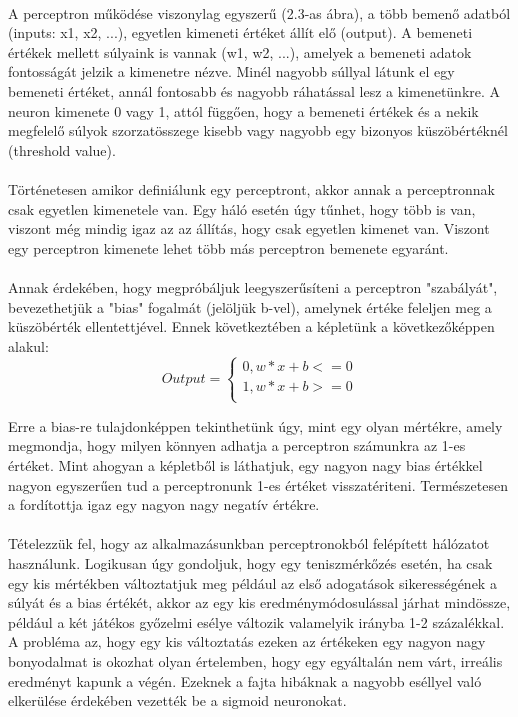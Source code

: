 \paragraph{}
A perceptron működése viszonylag egyszerű (2.3-as ábra), a több bemenő adatból (inputs: x1, x2, ...), egyetlen kimeneti értéket állít elő (output). A bemeneti értékek mellett súlyaink is vannak (w1, w2, ...), amelyek a bemeneti adatok fontosságát jelzik a kimenetre nézve. Minél nagyobb súllyal látunk el egy bemeneti értéket, annál fontosabb és nagyobb ráhatással lesz a kimenetünkre. A neuron kimenete 0 vagy 1, attól függően, hogy a bemeneti értékek és a nekik megfelelő súlyok szorzatösszege kisebb vagy nagyobb egy bizonyos küszöbértéknél (threshold value).

\paragraph{}
Történetesen amikor definiálunk egy perceptront, akkor annak a perceptronnak csak egyetlen kimenetele van. Egy háló esetén úgy tűnhet, hogy több is van, viszont még mindig igaz az az állítás, hogy csak egyetlen kimenet van. Viszont egy perceptron kimenete lehet több más perceptron bemenete egyaránt.

\paragraph{}
Annak érdekében, hogy megpróbáljuk leegyszerűsíteni a perceptron "szabályát", bevezethetjük a "bias" fogalmát (jelöljük b-vel), amelynek értéke feleljen meg a küszöbérték ellentettjével. Ennek következtében a képletünk a következőképpen alakul:
\[ 
Output= \left\{
\begin{array}{ll}
      0, w*x + b <= 0 \\
      1, w*x + b >= 0 \\
\end{array} 
\right. 
\]

Erre a bias-re tulajdonképpen tekinthetünk úgy, mint egy olyan mértékre, amely megmondja, hogy milyen könnyen adhatja a perceptron számunkra az 1-es értéket. Mint ahogyan a képletből is láthatjuk, egy nagyon nagy bias értékkel nagyon egyszerűen tud a perceptronunk 1-es értéket visszatériteni. Természetesen a fordítottja igaz egy nagyon nagy negatív értékre.

\paragraph{}
Tételezzük fel, hogy az alkalmazásunkban perceptronokból felépített hálózatot használunk. Logikusan úgy gondoljuk, hogy egy teniszmérkőzés esetén, ha csak egy kis mértékben változtatjuk meg például az első adogatások sikerességének a súlyát és a bias értékét, akkor az egy kis eredménymódosulással járhat mindössze, például a két játékos győzelmi esélye változik valamelyik irányba 1-2 százalékkal. A probléma az, hogy egy kis változtatás ezeken az értékeken egy nagyon nagy bonyodalmat is okozhat olyan értelemben, hogy egy egyáltalán nem várt, irreális eredményt kapunk a végén. Ezeknek a fajta hibáknak a nagyobb eséllyel való elkerülése érdekében vezették be a sigmoid neuronokat.

